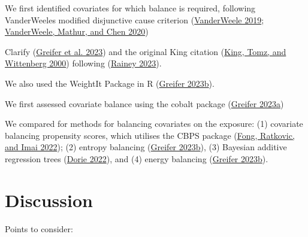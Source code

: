 \documentclass[
  singlecolumn]{report}
\begin{document}
We first identified covariates for which balance is required, following
VanderWeeles modified disjunctive cause criterion
(\protect\hyperlink{ref-vanderweele2019}{VanderWeele 2019};
\protect\hyperlink{ref-vanderweele2020}{VanderWeele, Mathur, and Chen
2020})

Clarify (\protect\hyperlink{ref-greifer2023}{Greifer et al. 2023}) and
the original King citation (\protect\hyperlink{ref-king2000}{King, Tomz,
and Wittenberg 2000}) following
(\protect\hyperlink{ref-rainey2023}{Rainey 2023}).

We also used the WeightIt Package in R
(\protect\hyperlink{ref-greifer2023a}{Greifer 2023b}).

\hfill\break
We first assessed covariate balance using the cobalt package
(\protect\hyperlink{ref-greifer2023b}{Greifer 2023a})

We compared for methods for balancing covariates on the exposure: (1)
covariate balancing propensity scores, which utilises the CBPS package
(\protect\hyperlink{ref-CBPS}{Fong, Ratkovic, and Imai 2022}); (2)
entropy balancing (\protect\hyperlink{ref-greifer2023a}{Greifer 2023b}),
(3) Bayesian additive regression trees
(\protect\hyperlink{ref-dbarts}{Dorie 2022}), and (4) energy balancing
(\protect\hyperlink{ref-greifer2023a}{Greifer 2023b}).

\hypertarget{discussion}{%
\section{Discussion}\label{discussion}}

Points to consider:
\end{document}
